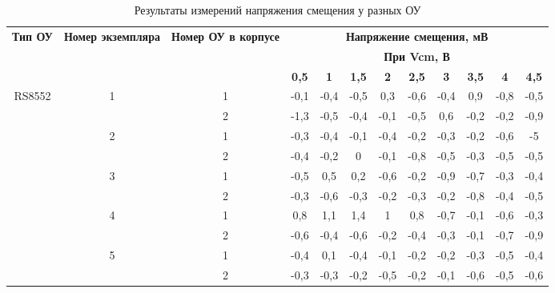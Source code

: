   \begin{table}[H]
    \centering
    \caption{Результаты измерений напряжения смещения у разных ОУ}
      \begin{tabular}{|c|c|c|c|c|c|c|c|c|c|c|c|}
      \hline
      \multicolumn{1}{|c|}{\multirow{3}[6]{2cm}{\textbf{Тип ОУ}}} & \multicolumn{1}{c|}{\multirow{3}[6]{1.4cm}{\textbf{Номер экземпляра}}} & \multicolumn{1}{c|}{\multirow{3}[6]{1.8cm}{\textbf{Номер ОУ в корпусе}}} & \multicolumn{9}{|c|}{\textbf{Напряжение смещения, мВ}} \bigstrut\\
  \cline{4-12}          &       &       & \multicolumn{9}{|c|}{\textbf{При Vcm, В}} \bigstrut\\
  \cline{4-12}          &       &       & \textbf{0,5} & \textbf{1} & \textbf{1,5} & \textbf{2} & \textbf{2,5} & \textbf{3} & \textbf{3,5} & \textbf{4} & \textbf{4,5} \bigstrut\\
      \hline
      \multicolumn{1}{|c|}{\multirow{10}[20]{*}{RS8552}} & \multirow{2}[4]{*}{1} & 1     & -0,1  & -0,4  & -0,5  & 0,3   & -0,6  & -0,4  & 0,9   & -0,8  & -0,5 \bigstrut\\
  \cline{3-12}          &       & 2     & -1,3  & -0,5  & -0,4  & -0,1  & -0,5  & 0,6   & -0,2  & -0,2  & -0,9 \bigstrut\\
  \cline{2-12}          & \multirow{2}[4]{*}{2} & 1     & -0,3  & -0,4  & -0,1  & -0,4  & -0,2  & -0,3  & -0,2  & -0,6  & -5 \bigstrut\\
  \cline{3-12}          &       & 2     & -0,4  & -0,2  & 0     & -0,1  & -0,8  & -0,5  & -0,3  & -0,5  & -0,5 \bigstrut\\
  \cline{2-12}          & \multirow{2}[4]{*}{3} & 1     & -0,5  & 0,5   & 0,2   & -0,6  & -0,2  & -0,9  & -0,7  & -0,3  & -0,4 \bigstrut\\
  \cline{3-12}          &       & 2     & -0,3  & -0,6  & -0,3  & -0,2  & -0,3  & -0,2  & -0,8  & -0,4  & -0,5 \bigstrut\\
  \cline{2-12}          & \multirow{2}[4]{*}{4} & 1     & 0,8   & 1,1   & 1,4   & 1     & 0,8   & -0,7  & -0,1  & -0,6  & -0,3 \bigstrut\\
  \cline{3-12}          &       & 2     & -0,6  & -0,4  & -0,6  & -0,2  & -0,4  & -0,3  & -0,1  & -0,7  & -0,9 \bigstrut\\
  \cline{2-12}          & \multirow{2}[4]{*}{5} & 1     & -0,4  & 0,1   & -0,4  & -0,1  & -0,2  & -0,2  & -0,3  & -0,5  & -0,4 \bigstrut\\
  \cline{3-12}          &       & 2     & -0,3  & -0,3  & -0,2  & -0,5  & -0,2  & -0,1  & -0,6  & -0,5  & -0,6 \bigstrut\\

\end{tabular}
\end{table}
